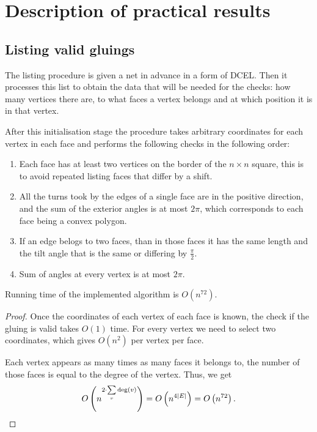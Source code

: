 \documentclass[a4paper,11pt]{article}
\begin{document}
\section{Description of practical results}

\subsection{Listing valid gluings}

The listing procedure is given a net in advance in a form of DCEL. Then it processes this list to obtain the data that will be needed for the checks: how many vertices there are, to what faces a vertex belongs and at which position it is in that vertex.

After this initialisation stage the procedure takes arbitrary coordinates for each vertex in each face and performs the following checks in the following order:

\begin{enumerate}
	\item Each face has at least two vertices on the border of the $n \times n$ square, this is to avoid repeated listing faces that differ by a shift.
	\item All the turns took by the edges of a single face are in the positive direction, and the sum of the exterior angles is at most $2 \pi$, which corresponds to each face being a convex polygon.
	\item If an edge belogs to two faces, than in those faces it has the same length and the tilt angle that is the same or differing by $\frac{\pi}{2}$.
	\item Sum of angles at every vertex is at most $2 \pi$.
\end{enumerate}

\begin{theorem}
	Running time of the implemented algorithm is $O(n^{72})$.
\end{theorem}

\begin{proof}
	Once the coordinates of each vertex of each face is known, the check if the gluing is valid takes $O(1)$ time. For every vertex we need to select two coordinates, which gives $O(n^2)$ per vertex per face.

	Each vertex appears as many times as many faces it belongs to, the number of those faces is equal to the degree of the vertex. Thus, we get
	\[ O \left( n^{2 \cdot \sum\limits_v \deg (v)} \right)
		= O \left( n^{4 |E|} \right)
		= O \left( n^{72} \right) . \]
\end{proof}
\end{document}
